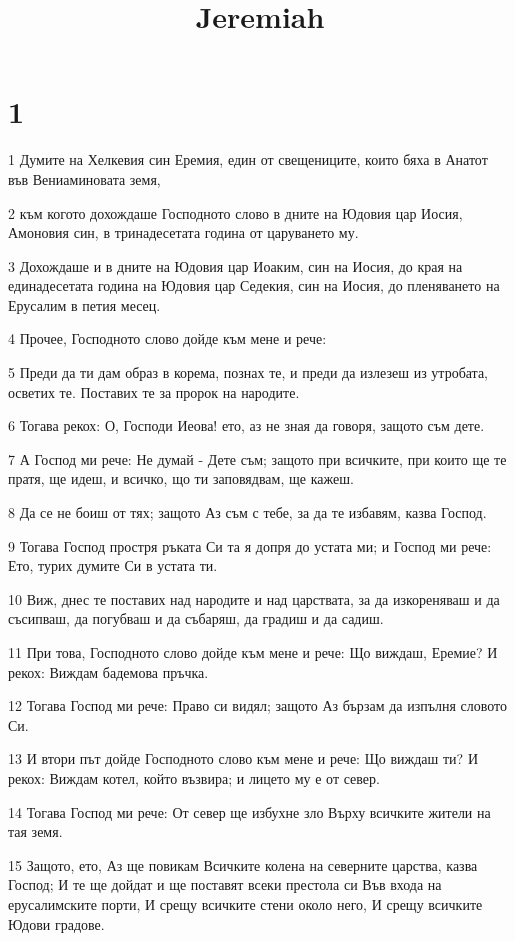 

\title{Jeremiah}


\chapter{1}

\par 1 Думите на Хелкевия син Еремия, един от свещениците, които бяха в Анатот във Вениаминовата земя,
\par 2 към когото дохождаше Господното слово в дните на Юдовия цар Иосия, Амоновия син, в тринадесетата година от царуването му.
\par 3 Дохождаше и в дните на Юдовия цар Иоаким, син на Иосия, до края на единадесетата година на Юдовия цар Седекия, син на Иосия, до пленяването на Ерусалим в петия месец.
\par 4 Прочее, Господното слово дойде към мене и рече:
\par 5 Преди да ти дам образ в корема, познах те, и преди да излезеш из утробата, осветих те. Поставих те за пророк на народите.
\par 6 Тогава рекох: О, Господи Иеова! ето, аз не зная да говоря, защото съм дете.
\par 7 А Господ ми рече: Не думай - Дете съм; защото при всичките, при които ще те пратя, ще идеш, и всичко, що ти заповядвам, ще кажеш.
\par 8 Да се не боиш от тях; защото Аз съм с тебе, за да те избавям, казва Господ.
\par 9 Тогава Господ простря ръката Си та я допря до устата ми; и Господ ми рече: Ето, турих думите Си в устата ти.
\par 10 Виж, днес те поставих над народите и над царствата, за да изкореняваш и да съсипваш, да погубваш и да събаряш, да градиш и да садиш.
\par 11 При това, Господното слово дойде към мене и рече: Що виждаш, Еремие? И рекох: Виждам бадемова пръчка.
\par 12 Тогава Господ ми рече: Право си видял; защото Аз бързам да изпълня словото Си.
\par 13 И втори път дойде Господното слово към мене и рече: Що виждаш ти? И рекох: Виждам котел, който възвира; и лицето му е от север.
\par 14 Тогава Господ ми рече: От север ще избухне зло Върху всичките жители на тая земя.
\par 15 Защото, ето, Аз ще повикам Всичките колена на северните царства, казва Господ; И те ще дойдат и ще поставят всеки престола си Във входа на ерусалимските порти, И срещу всичките стени около него, И срещу всичките Юдови градове.
